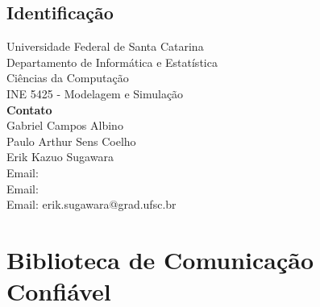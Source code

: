 \documentclass[
	12pt,				%
	openright,			%
	oneside,			%
	a4paper,			%
	english,			%
	french,				%
	spanish,			%
	brazil				%
	]{abntex2}
\begin{document}

\tableofcontents*
\cleardoublepage



\textual

\chapter*[Introdução]{Identificação}

\begin{center}
	Universidade Federal de Santa Catarina \\
	Departamento de Informática e Estatística\\
	Ciências da Computação \\
	INE 5425 - Modelagem e Simulação \\
	\vspace*{5cm}
	\textbf{Contato} \\
	\vspace*{1cm}
    Gabriel Campos Albino\\
    Paulo Arthur Sens Coelho\\
	Erik Kazuo Sugawara \\
	Email:\\
	Email:\\
	Email: erik.sugawara@grad.ufsc.br \\
\end{center}
\part{Biblioteca de Comunicação Confiável}



\end{document}
